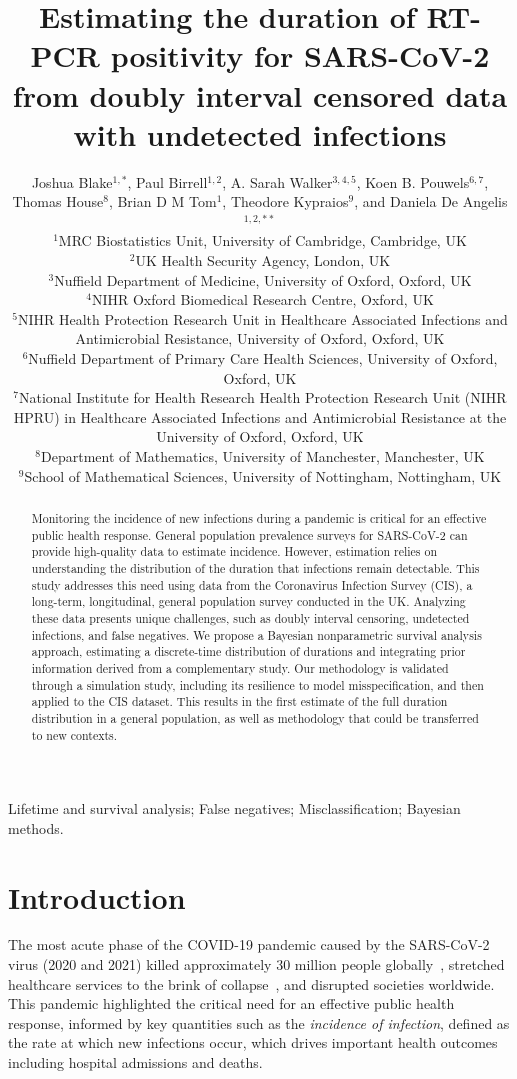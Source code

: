 \documentclass[referee,useAMS,usenatbib]{biom}
\title[Estimating duration]{Estimating the duration of RT-PCR positivity for SARS-CoV-2 from doubly interval censored data with undetected infections}
\author{Joshua Blake$^{1,*}$\email{joshua.blake@mrc-bsu.cam.ac.uk},
Paul Birrell$^{1,2}$,
A. Sarah Walker$^{3,4,5}$,
Koen B. Pouwels$^{6,7}$,
Thomas House$^{8}$,
Brian D M Tom$^{1}$,
Theodore Kypraios$^{9}$, and
Daniela De Angelis$^{1,2,**}$\email{daniela.deangelis@mrc-bsu.cam.ac.uk} \\
$^{1}$MRC Biostatistics Unit, University of Cambridge, Cambridge, UK \\
$^{2}$UK Health Security Agency, London, UK \\
$^{3}$Nuffield Department of Medicine, University of Oxford, Oxford, UK \\
$^{4}$NIHR Oxford Biomedical Research Centre, Oxford, UK \\
$^{5}$NIHR Health Protection Research Unit in Healthcare Associated Infections and Antimicrobial Resistance, University of Oxford, Oxford, UK \\
$^{6}$Nuffield Department of Primary Care Health Sciences, University of Oxford, Oxford, UK \\
$^{7}$National Institute for Health Research Health Protection Research Unit (NIHR HPRU) in Healthcare Associated Infections and Antimicrobial Resistance at the University of Oxford, Oxford, UK \\
$^{8}$Department of Mathematics, University of Manchester, Manchester, UK \\
$^{9}$School of Mathematical Sciences, University of Nottingham, Nottingham, UK}
\begin{document}
\pagerange{\pageref{firstpage}--\pageref{lastpage}} 

\label{firstpage}

\begin{abstract}
Monitoring the incidence of new infections during a pandemic is critical for an effective public health response. General population prevalence surveys for SARS-CoV-2 can provide high-quality data to estimate incidence.  However, estimation relies on understanding the distribution of the duration that infections remain detectable. This study addresses this need using data from the Coronavirus Infection Survey (CIS), a long-term, longitudinal, general population survey conducted in the UK. Analyzing these data presents unique challenges, such as doubly interval censoring, undetected infections, and false negatives. We propose a Bayesian nonparametric survival analysis approach, estimating a discrete-time distribution of durations and integrating prior information derived from a complementary study. Our methodology is validated through a simulation study, including its resilience to model misspecification, and then applied to the CIS dataset. This results in the first estimate of the full duration distribution in a general population, as well as methodology that could be transferred to new contexts.
\end{abstract}

\begin{keywords}  Lifetime and survival analysis; False negatives; Misclassification; Bayesian methods. \end{keywords}

\maketitle


\section{Introduction} \label{sec:intro}

The most acute phase of the COVID-19 pandemic caused by the SARS-CoV-2 virus (2020 and 2021) killed approximately 30 million people globally~\citep{whoCOVIDExcess}, stretched healthcare services to the brink of collapse~\citep{fongNHS}, and disrupted societies worldwide.
This pandemic highlighted the critical need for an effective public health response, informed by key quantities such as the \emph{incidence of infection}, defined as the rate at which new infections occur, which drives important health outcomes including hospital admissions and deaths. 
\end{document}
